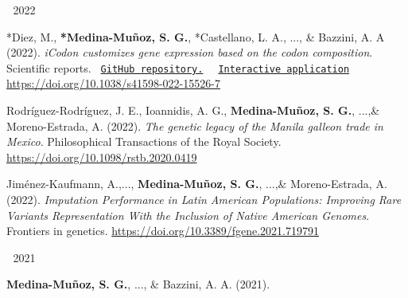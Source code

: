 \begin{cventries}
\cventry
{$\;$}
{2022}
{$\;$}
{$\;$}
{
  \begin{cvitems} %
      \item {
          \begin{flushleft}
            *Diez, M., \textbf{*Medina-Muñoz, S. G.}, *Castellano, L. A., ..., \& Bazzini, A. A (2022).
            \textit{iCodon customizes gene expression based on the codon composition}. Scientific reports.
              \texttt{
              \href{https://github.com/santiago1234/iCodon}{GitHub repository.}
              }
              \texttt{
              \href{http://icodon.org/}{Interactive application}
              } \linebreak
            \url{https://doi.org/10.1038/s41598-022-15526-7}
          \end{flushleft}
        }
      \item {
        \begin{flushleft}
          Rodríguez-Rodríguez, J. E., Ioannidis, A. G., \textbf{Medina-Muñoz, S. G.}, ...,\& Moreno-Estrada, A. (2022).
          \textit{The genetic legacy of the Manila galleon trade in Mexico}. Philosophical Transactions of the Royal Society.
          \linebreak
          \url{https://doi.org/10.1098/rstb.2020.0419}
        \end{flushleft}
      }
      \item {
        \begin{flushleft}
          Jiménez-Kaufmann, A.,..., \textbf{Medina-Muñoz, S. G.}, ...,\& Moreno-Estrada, A. (2022).
          \textit{Imputation Performance in Latin American Populations: Improving Rare Variants Representation With the Inclusion of Native American Genomes}. Frontiers in genetics.
          \linebreak
          \url{https://doi.org/10.3389/fgene.2021.719791}
        \end{flushleft}
      }
  \end{cvitems}
}
  \cventry
    {$\;$}
    {2021}
    {$\;$}
    {$\;$}
    {
      \begin{cvitems} %
        \item {
            \begin{flushleft}
              \textbf{Medina-Muñoz, S. G.}, ..., \& Bazzini, A. A. (2021).

\end{flushleft}}
\end{cvitems}}
\end{cventries}
